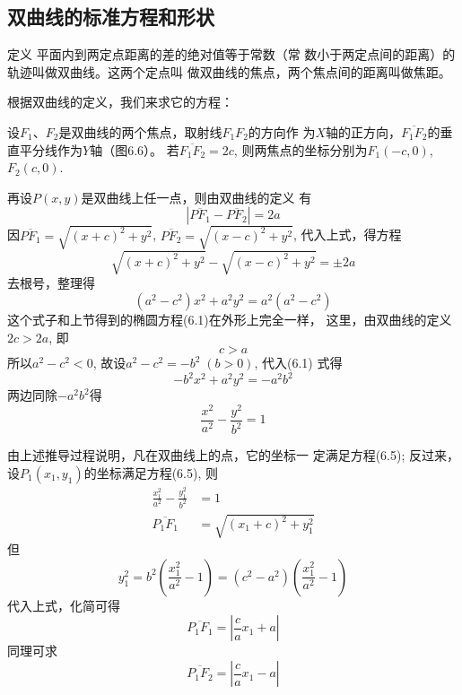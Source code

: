 \subsection{双曲线的标准方程和形状}
\begin{blk}
    {定义} 平面内到两定点距离的差的绝对值等于常数（常
数小于两定点间的距离）的轨迹叫做双曲线。这两个定点叫
做双曲线的焦点，两个焦点间的距离叫做焦距。
\end{blk}

根据双曲线的定义，我们来求它的方程：
\begin{figure}[htp]
    \centering
{}
    \caption{}
\end{figure}

设$F_1$、$F_2$是双曲线的两个焦点，取射线$F_1F_2$的方向作
为$X$轴的正方向，$\overline{F_1F_2}$的垂直平分线作为$Y$轴（图6.6）。
若$\overline{F_1F_2}=2c$, 则两焦点的坐标分别为$F_1(-c,0)$, $F_2
(c,0)$. 

再设$P(x,y)$是双曲线上任一点，则由双曲线的定义
有
\[|\overline{PF_1}-\overline{PF_2}|=2a\]
因$\overline{PF_1}=\sqrt{(x+c)^2+y^2}$, $\overline{PF_2}=
\sqrt{(x-c)^2+y^2}$, 
代入上式，得方程
\[\sqrt{(x+c)^2+y^2}-\sqrt{(x-c)^2+y^2}=\pm 2a\]
去根号，整理得
\begin{equation*}
    (a^2-c^2)x^2+a^2y^2=a^2(a^2-c^2)
\end{equation*}
这个式子和上节得到的椭圆方程(6.1)在外形上完全一样，
这里，由双曲线的定义$2c>2a$, 即
\[c>a\]
所以$a^2-c^2<0$, 故设$a^2-c^2=-b^2\; (b>0)$, 代入(6.1)
式得
\[-b^2x^2+a^2y^2=-a^2b^2\]
两边同除$-a^2b^2$得
\begin{equation}
    \boxed{\frac{x^2}{a^2}-\frac{y^2}{b^2}=1}
\end{equation}

由上述推导过程说明，凡在双曲线上的点，它的坐标一
定满足方程(6.5); 反过来，
设$P_1(x_1,y_1)$的坐标满足方程(6.5), 则
\[\begin{split}
    \frac{x^2_1}{a^2}-\frac{y^2_1}{b^2}&=1\\
    \overline{P_1F_1}&=\sqrt{(x_1+c)^2+y_1^2}
\end{split}\]
但
\[y^2_1=b^2\left(\frac{x_1^2}{a^2}-1\right)=(c^2-a^2)\left(\frac{x_1^2}{a^2}-1\right)\]
代入上式，化简可得
\begin{equation}
    \overline{P_1F_1}=\left|\frac{c}{a}x_1+a\right|
\end{equation}
同理可求
\begin{equation}
    \overline{P_1F_2}=\left|\frac{c}{a}x_1-a\right|
\end{equation}

